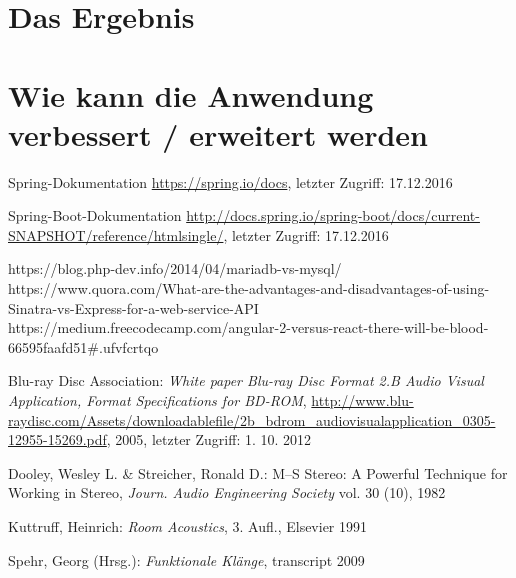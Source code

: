 \section{Das Ergebnis}


\section{Wie kann die Anwendung verbessert / erweitert werden}

\listoffigures
\begin{thebibliography}{}


Spring-Dokumentation
\url{https://spring.io/docs}, letzter Zugriff: 17.12.2016

Spring-Boot-Dokumentation
\url{http://docs.spring.io/spring-boot/docs/current-SNAPSHOT/reference/htmlsingle/}, letzter Zugriff: 17.12.2016

https://blog.php-dev.info/2014/04/mariadb-vs-mysql/
https://www.quora.com/What-are-the-advantages-and-disadvantages-of-using-Sinatra-vs-Express-for-a-web-service-API
https://medium.freecodecamp.com/angular-2-versus-react-there-will-be-blood-66595faafd51#.ufvfcrtqo


Blu-ray Disc Association: 
\emph{White paper Blu-ray Disc Format 2.B Audio Visual Application, Format Specifications for BD-ROM}, 
\url{http://www.blu-raydisc.com/Assets/downloadablefile/2b_bdrom_audiovisualapplication_0305-12955-15269.pdf}, 2005, letzter Zugriff: 1. 10. 2012




Dooley, Wesley L.  \& Streicher, Ronald D.:
\glqq M--S Stereo: A Powerful Technique for Working in Stereo\grqq, 
\emph{Journ. Audio Engineering Society} vol. 30 (10), 1982

Kuttruff, Heinrich: 
\emph{Room Acoustics}, 3. Aufl., Elsevier 1991

Spehr, Georg (Hrsg.): 
\emph{Funktionale Klänge}, transcript 2009


\end{thebibliography}
